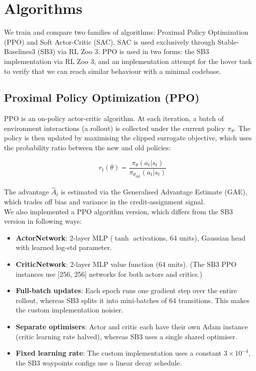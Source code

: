 \documentclass[11pt,a4paper]{article}
\begin{document}
\section{Algorithms}

We train and compare two families of algorithms: Proximal Policy Optimization (PPO) and
Soft Actor-Critic (SAC).  SAC is used exclusively through Stable-Baselines3 (SB3) via RL Zoo 3.
PPO is used in two forms: the SB3 implementation via RL Zoo 3, and an implementation attempt for the hover task to verify that we can reach similar behaviour with a minimal
codebase.

\subsection{Proximal Policy Optimization (PPO)}

PPO is an on-policy actor-critic algorithm. At each iteration, a batch of environment interactions (a rollout) is collected under the current policy $\pi_\theta$. The policy is then updated by maximising the clipped surrogate objective, which uses the probability ratio between the new and old policies:

\[
 \quad r_t(\theta) = \frac{\pi_\theta(a_t|s_t)}{\pi_{\theta_{\text{old}}}(a_t|s_t)}
\] \\

The advantage $\hat{A}_t$ is estimated via the Generalised Advantage Estimate (GAE), which trades off bias and variance in the credit-assignment signal. \\

We also implemented a PPO algorithm version, which differs from the SB3 version
in following ways:

\begin{itemize}[nosep]
  \item \textbf{ActorNetwork}: 2-layer MLP ($\tanh$ activations, 64 units), Gaussian head with learned
    log-std parameter.
  \item \textbf{CriticNetwork}: 2-layer MLP value function (64 units). (The SB3 PPO instances use [256, 256] networks for both actors and critics.)
  \item \textbf{Full-batch updates}: Each epoch runs one gradient step over the entire rollout,
    whereas SB3 splits it into mini-batches of 64 transitions.  This makes the custom
    implementation noisier.
  \item \textbf{Separate optimisers}: Actor and critic each have their own Adam instance
    (critic learning rate halved), whereas SB3 uses a single shared optimiser.
  \item \textbf{Fixed learning rate}: The custom implementation uses a constant $3\times10^{-4}$,
    the SB3 waypoints configs use a linear decay schedule.
\end{itemize}
\end{document}
